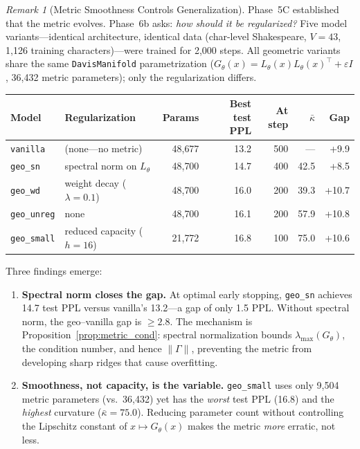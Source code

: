 \documentclass[11pt,a4paper]{article}
\theoremstyle{definition}
\theoremstyle{remark}
\newtheorem{remark}[theorem]{Remark}
\begin{document}
\begin{remark}[Metric Smoothness Controls Generalization]%
\label{rem:metric_smoothness}
Phase~5C established that the metric evolves. Phase~6b asks: 
\emph{how should it be regularized?} Five model variants---identical 
architecture, identical data (char-level Shakespeare, $V = 43$, 
1{,}126 training characters)---were trained for 2{,}000 steps. 
All geometric variants share the same \texttt{DavisManifold} 
parametrization ($G_\theta(x) = L_\theta(x)L_\theta(x)^\top + 
\varepsilon I$, 36{,}432 metric parameters); only the regularization 
differs.

\begin{center}
\begin{tabular}{llrrrrr}
\toprule
Model & Regularization & Params & Best test PPL & At step & $\bar\kappa$ & Gap \\
\midrule
\texttt{vanilla} & (none---no metric) & 48{,}677 & 13.2 & 500 & --- & +9.9 \\
\texttt{geo\_sn} & spectral norm on $L_\theta$ & 48{,}700 & 14.7 & 400 & 42.5 & +8.5 \\
\texttt{geo\_wd} & weight decay ($\lambda = 0.1$) & 48{,}700 & 16.0 & 200 & 39.3 & +10.7 \\
\texttt{geo\_unreg} & none & 48{,}700 & 16.1 & 200 & 57.9 & +10.8 \\
\texttt{geo\_small} & reduced capacity ($h = 16$) & 21{,}772 & 16.8 & 100 & 75.0 & +10.6 \\
\bottomrule
\end{tabular}
\end{center}

Three findings emerge:

\begin{enumerate}[nosep]
\item \textbf{Spectral norm closes the gap.} At optimal early 
stopping, \texttt{geo\_sn} achieves 14.7 test PPL versus vanilla's 
13.2---a gap of only 1.5 PPL. Without spectral norm, the geo--vanilla 
gap is $\geq 2.8$. The mechanism is 
Proposition~\ref{prop:metric_cond}: spectral normalization bounds 
$\lambda_{\max}(G_\theta)$, the condition number, and hence 
$\|\Gamma\|$, preventing the metric from developing sharp ridges 
that cause overfitting.

\item \textbf{Smoothness, not capacity, is the variable.} 
\texttt{geo\_small} uses only 9{,}504 metric parameters (vs.\ 
36{,}432) yet has the \emph{worst} test PPL (16.8) and the 
\emph{highest} curvature ($\bar\kappa = 75.0$). Reducing 
parameter count without controlling the Lipschitz constant of 
$x \mapsto G_\theta(x)$ makes the metric \emph{more} erratic, 
not less.


\end{enumerate}
\end{remark}
\end{document}
